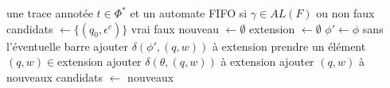 \begin{algo}[Appartenance à $AL(F)$]
  \begin{algorithmic}[1]
    \REQUIRE une trace annotée $t\in\Phi^*$ et un automate FIFO \fifo
    \ENSURE si $\gamma\in AL(F)$ ou non
      \RETURN faux
    \ENDIF
    \STATE candidats $\leftarrow\{(q_0,\epsilon^c)\}$
        \STATE {}
            \RETURN vrai
          \ENDIF
        \ENDFOR
        \RETURN faux
      \ELSE
        \STATE {}
        \STATE nouveau $\leftarrow\emptyset$
        \STATE extension $\leftarrow\emptyset$
          \STATE $\phi'\leftarrow\phi$ sans l'éventuelle barre
          \STATE ajouter $\delta(\phi', (q,w))$ à extension
        \ENDFOR
          \STATE {}
          \STATE prendre un élément $(q,w)\in$extension
              \STATE ajouter $\delta(\theta, (q,w))$ à extension
            \ENDIF
          \ENDFOR
          \STATE ajouter $(q,w)$ à nouveaux
        \ENDWHILE
        \STATE candidats $\leftarrow$ nouveaux
      \ENDIF
    \ENDFOR
  \end{algorithmic}
\end{algo}
